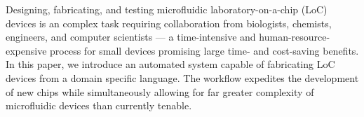 Designing, fabricating, and testing microfluidic laboratory-on-a-chip (LoC) devices is an complex task requiring collaboration from biologists, chemists, engineers, and computer scientists --- 
a time-intensive and human-resource-expensive process for small devices promising large time- and cost-saving benefits.
In this paper, we introduce an automated system capable of fabricating LoC devices from a domain specific language.
The workflow expedites the development of new chips while simultaneously allowing for far greater complexity of microfluidic devices than currently tenable.